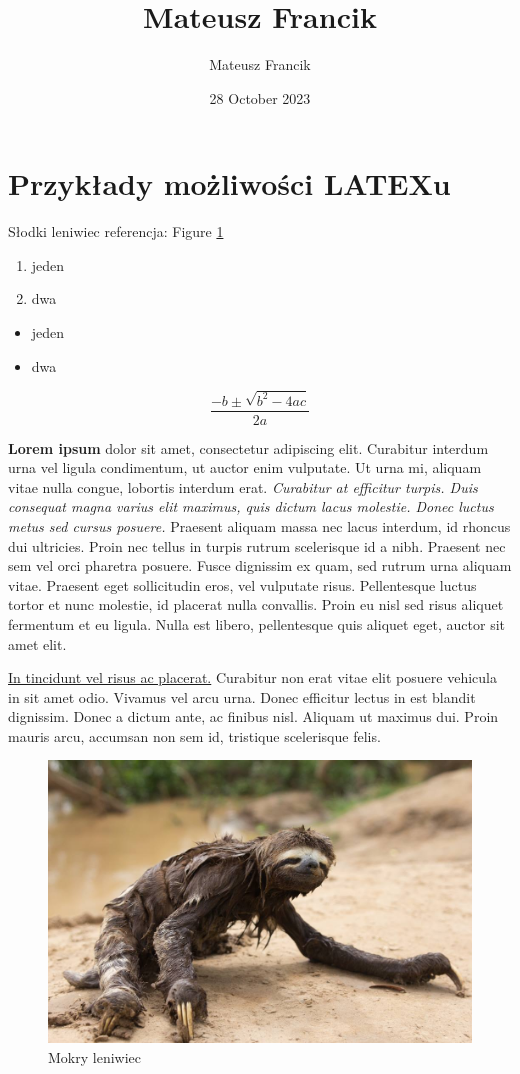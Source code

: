 \documentclass{article}
\title{Mateusz Francik}
\author{Mateusz Francik}
\date{28 October 2023}
\begin{document}
\maketitle

\section{Przykłady możliwości LATEXu}
    Słodki leniwiec referencja: Figure \ref{fig:sloth}
    \begin{enumerate}
        \item jeden
        \item dwa
    \end{enumerate}
    \begin{itemize}
        \item jeden
        \item dwa
    \end{itemize}
    $$\frac{-b\pm\sqrt{b^2-4ac}}{2a}$$
    \par \textbf{Lorem ipsum} dolor sit amet, consectetur adipiscing elit. Curabitur interdum urna vel ligula condimentum, ut auctor enim vulputate. Ut urna mi, aliquam vitae nulla congue, lobortis interdum erat. \textit{Curabitur at efficitur turpis. Duis consequat magna varius elit maximus, quis dictum lacus molestie. Donec luctus metus sed cursus posuere.} Praesent aliquam massa nec lacus interdum, id rhoncus dui ultricies. Proin nec tellus in turpis rutrum scelerisque id a nibh. Praesent nec sem vel orci pharetra posuere. Fusce dignissim ex quam, sed rutrum urna aliquam vitae. Praesent eget sollicitudin eros, vel vulputate risus. Pellentesque luctus tortor et nunc molestie, id placerat nulla convallis. Proin eu nisl sed risus aliquet fermentum et eu ligula. Nulla est libero, pellentesque quis aliquet eget, auctor sit amet elit. 
    \par \underline{In tincidunt vel risus ac placerat.} Curabitur non erat vitae elit posuere vehicula in sit amet odio. Vivamus vel arcu urna. Donec efficitur lectus in est blandit dignissim. Donec a dictum ante, ac finibus nisl. Aliquam ut maximus dui. Proin mauris arcu, accumsan non sem id, tristique scelerisque felis. 
    
    \begin{figure}
        \includegraphics[scale=0.35]{pictures/mokry_leniwiec.jpg}
        \caption{Mokry leniwiec}
        \label{fig:sloth}
    \end{figure}
\end{document}
